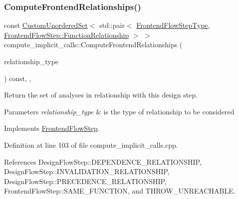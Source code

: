 \subsubsection{\texorpdfstring{Compute\+Frontend\+Relationships()}{ComputeFrontendRelationships()}}
{\footnotesize\ttfamily const \hyperlink{classCustomUnorderedSet}{Custom\+Unordered\+Set}$<$ std\+::pair$<$ \hyperlink{frontend__flow__step_8hpp_afeb3716c693d2b2e4ed3e6d04c3b63bb}{Frontend\+Flow\+Step\+Type}, \hyperlink{classFrontendFlowStep_af7cf30f2023e5b99e637dc2058289ab0}{Frontend\+Flow\+Step\+::\+Function\+Relationship} $>$ $>$ compute\+\_\+implicit\+\_\+calls\+::\+Compute\+Frontend\+Relationships (\begin{DoxyParamCaption}\item[{const \hyperlink{classDesignFlowStep_a723a3baf19ff2ceb77bc13e099d0b1b7}{Design\+Flow\+Step\+::\+Relationship\+Type}}]{relationship\+\_\+type }\end{DoxyParamCaption}) const\hspace{0.3cm}{\ttfamily [override]}, {\ttfamily [private]}, {\ttfamily [virtual]}}



Return the set of analyses in relationship with this design step. 


\begin{DoxyParams}{Parameters}
{\em relationship\+\_\+type} & is the type of relationship to be considered \\
\hline
\end{DoxyParams}


Implements \hyperlink{classFrontendFlowStep_abeaff70b59734e462d347ed343dd700d}{Frontend\+Flow\+Step}.



Definition at line 103 of file compute\+\_\+implicit\+\_\+calls.\+cpp.



References Design\+Flow\+Step\+::\+D\+E\+P\+E\+N\+D\+E\+N\+C\+E\+\_\+\+R\+E\+L\+A\+T\+I\+O\+N\+S\+H\+IP, Design\+Flow\+Step\+::\+I\+N\+V\+A\+L\+I\+D\+A\+T\+I\+O\+N\+\_\+\+R\+E\+L\+A\+T\+I\+O\+N\+S\+H\+IP, Design\+Flow\+Step\+::\+P\+R\+E\+C\+E\+D\+E\+N\+C\+E\+\_\+\+R\+E\+L\+A\+T\+I\+O\+N\+S\+H\+IP, Frontend\+Flow\+Step\+::\+S\+A\+M\+E\+\_\+\+F\+U\+N\+C\+T\+I\+ON, and T\+H\+R\+O\+W\+\_\+\+U\+N\+R\+E\+A\+C\+H\+A\+B\+LE.

\mbox{\label{classcompute__implicit__calls_ae2088a9a4859e68a380a05875901b9e3}} 
